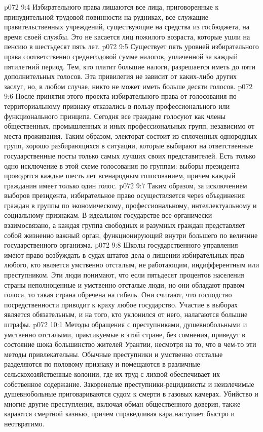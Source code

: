 \vs p072 9:4 \bibnobreakspace Избирательного права лишаются все лица, приговоренные к принудительной трудовой повинности на рудниках, все служащие правительственных учреждений, существующие на средства из госбюджета, на время своей службы. Это не касается лиц пожилого возраста, которые ушли на пенсию в шестьдесят пять лет.
\vs p072 9:5 \bibnobreakspace Существует пять уровней избирательного права соответственно среднегодовой сумме налогов, уплаченной за каждый пятилетний период. Тем, кто платит большие налоги, разрешается иметь до пяти дополнительных голосов. Эта привилегия не зависит от каких\hyp{}либо других заслуг, но, в любом случае, никто не может иметь больше десяти голосов.
\vs p072 9:6 \bibnobreakspace После принятия этого проекта избирательного права от голосования по территориальному признаку отказались в пользу профессионального или функционального принципа. Сегодня все граждане голосуют как члены общественных, промышленных и иных профессиональных групп, независимо от места проживания. Таким образом, электорат состоит из сплоченных однородных групп, хорошо разбирающихся в ситуации, которые выбирают на ответственные государственные посты только самых лучших своих представителей. Есть только одно исключение в этой схеме голосования по группам: выборы президента проводятся каждые шесть лет всенародным голосованием, причем каждый гражданин имеет только один голос.
\vs p072 9:7 \pc Таким образом, за исключением выборов президента, избирательное право осуществляется через объединения граждан в группы по экономическому, профессиональному, интеллектуальному и социальному признакам. В идеальном государстве все органически взаимосвязано, а каждая группа свободных и разумных граждан представляет собой жизненно важный орган, функционирующий внутри большего по величине государственного организма.
\vs p072 9:8 Школы государственного управления имеют право возбуждать в судах штатов дела о лишении избирательных прав любого, кто является умственно отсталым, не работающим, индифферентным или преступником. Эти люди понимают, что если пятьдесят процентов населения страны неполноценные и умственно отсталые люди, но они обладают правом голоса, то такая страна обречена на гибель. Они считают, что господство посредственности приводит к краху любое государство. Участие в выборах является обязательным, и на того, кто уклонился от него, налагаются большие штрафы.
\vs p072 10:1 Методы обращения с преступниками, душевнобольными и умственно отсталыми, практикуемые в этой стране, без сомнения, приведут в состояние шока большинство жителей Урантии, несмотря на то, что в чем\hyp{}то эти методы привлекательны. Обычные преступники и умственно отсталые разделяются по половому признаку и помещаются в различные сельскохозяйственные колонии, где их труд с лихвой обеспечивает их собственное содержание. Закоренелые преступники\hyp{}рецидивисты и неизлечимые душевнобольные приговариваются судом к смерти в газовых камерах. Убийство и многие другие преступления, включая обман общественного доверия, также караются смертной казнью, причем справедливая кара наступает быстро и неотвратимо.

